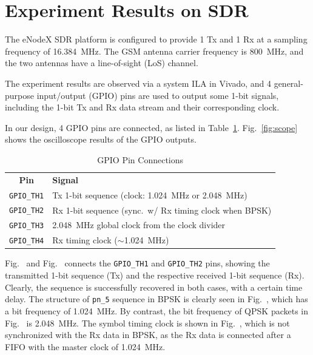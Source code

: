 \documentclass[journal,twoside]{IEEEtran}
\begin{document}
  \section{Experiment Results on SDR}

    The eNodeX SDR platform is configured to provide 1 Tx and 1 Rx
    at a sampling frequency of \qty{16.384}{MHz}.
    The GSM antenna carrier frequency is \qty{800}{MHz},
    and the two antennas have a line-of-sight (LoS) channel.

    The experiment results are observed via a system ILA in Vivado,
    and 4 general-purpose input/output (GPIO) pins are used to output some 1-bit signals,
    including the 1-bit Tx and Rx data stream and their corresponding clock.

    In our design, 4 GPIO pins are connected, as listed in Table~\ref{tab:gpio_pins}.
    Fig.~\ref{fig:scope} shows the oscilloscope results of the GPIO outputs.
    \begin{table}[htbp]
      \caption{GPIO Pin Connections}
      \label{tab:gpio_pins}
      \renewcommand{\arraystretch}{1.2}
      \begin{tabularx}{\linewidth}{cX}
        \toprule\tabvertspace
        \textbf{Pin} & \textbf{Signal} \\
        \tabvertspace\midrule
        \texttt{GPIO\_TH1} & Tx 1-bit sequence (clock: \qty{1.024}{MHz} or \qty{2.048}{MHz}) \\
        \texttt{GPIO\_TH2} & Rx 1-bit sequence (sync.\ w/ Rx timing clock when BPSK) \\
        \texttt{GPIO\_TH3} & \qty{2.048}{MHz} global clock from the clock divider \\
        \texttt{GPIO\_TH4} & Rx timing clock ($\sim$\qty{1.024}{MHz}) \\
        \bottomrule
      \end{tabularx}
    \end{table}

    Fig.~ and Fig.~
    connects the \texttt{GPIO\_TH1} and \texttt{GPIO\_TH2} pins,
    showing the transmitted 1-bit sequence (Tx) and the respective received 1-bit sequence (Rx).
    Clearly, the sequence is successfully recovered in both cases, with a certain time delay.
    The structure of \texttt{pn\_5} sequence in BPSK is clearly seen in Fig.~,
    which has a bit frequency of \qty{1.024}{MHz}.
    By contrast, the bit frequency of QPSK packets in Fig.~ is \qty{2.048}{MHz}.
    The symbol timing clock is shown in Fig.~,
    which is not synchronized with the Rx data in BPSK,
    as the Rx data is connected after a FIFO with the master clock of \qty{1.024}{MHz}.
\end{document}
